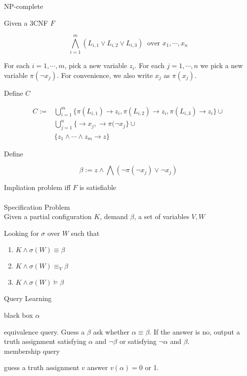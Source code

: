 \documentclass[12pt]{article}
\begin{document}
NP-complete  

Given a 3CNF  $F$

$$\bigwedge_{i=1}^m (L_{i,1}\vee L_{i,2}\vee L_{i,3}) \ \mbox{ over } x_1,\cdots, x_n$$

For each $i=1,\cdots,m$, pick a new variable $z_i$. For each $j=1,\cdots, n$ we pick a new variable $\pi(\neg x_j)$. For convenience, we also write $x_j$ as $\pi(x_j)$. 

Define $C$ 

$$\begin{array}{ll}C:=&
\bigcup_{i=1}^m\{\pi(L_{i,1})\rightarrow z_i, \pi(L_{i,2})\rightarrow z_i, \pi(L_{i,3})\rightarrow z_i\}\cup\\ & \bigcup_{j=1}^n\{\rightarrow x_j, \rightarrow \pi(\neg x_j\} \cup\\ &
\{z_1\wedge\cdots\wedge z_m\rightarrow z\}\end{array}$$

Define 

$$\beta:=z\wedge\bigwedge (\neg \pi(\neg x_j)\vee \neg x_j)$$


Impliation problem iff $F$ is satisfiable \\


\ \\


Specification Problem\\

Given a partial configuration $K$, demand $\beta$, a set of variables $V,W$

Looking for $\sigma$ over $W$ such that

\begin{enumerate}
\item $K\wedge \sigma(W)\equiv \beta$

\item $K\wedge\sigma(W) \equiv_V\beta$

\item $K\wedge\sigma(W)\models \beta$
\end{enumerate}


Query Learning 

black box $\alpha$   

equivalence query. Guess a $\beta$ ask whether $\alpha\equiv \beta$. If the answer is no, output a truth assignment satisfying $\alpha$ and $\neg \beta$ or satisfying $\neg\alpha$ and $\beta$.\\

membership query

guess a truth assignment $v$ answer $v(\alpha)=0$ or 1. \\
\end{document}
